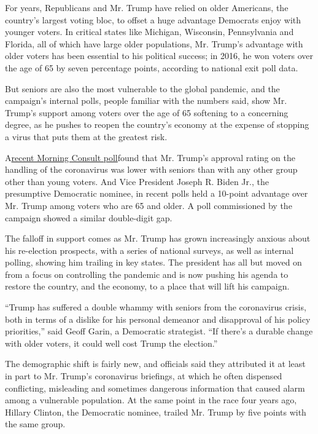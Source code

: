 For years, Republicans and Mr. Trump have relied on older Americans, the
country's largest voting bloc, to offset a huge advantage Democrats
enjoy with younger voters. In critical states like Michigan, Wisconsin,
Pennsylvania and Florida, all of which have large older populations, Mr.
Trump's advantage with older voters has been essential to his political
success; in 2016, he won voters over the age of 65 by seven percentage
points, according to national exit poll data.

But seniors are also the most vulnerable to the global pandemic, and the
campaign's internal polls, people familiar with the numbers said, show
Mr. Trump's support among voters over the age of 65 softening to a
concerning degree, as he pushes to reopen the country's economy at the
expense of stopping a virus that puts them at the greatest risk.

A\href{https://morningconsult.com/form/coronavirus-outbreak-tracker/}{recent
Morning Consult poll}found that Mr. Trump's approval rating on the
handling of the coronavirus was lower with seniors than with any other
group other than young voters. And Vice President Joseph R. Biden Jr.,
the presumptive Democratic nominee, in recent polls held a 10-point
advantage over Mr. Trump among voters who are 65 and older. A poll
commissioned by the campaign showed a similar double-digit gap.

The falloff in support comes as Mr. Trump has grown increasingly anxious
about his re-election prospects, with a series of national surveys, as
well as internal polling, showing him trailing in key states. The
president has all but moved on from a focus on controlling the pandemic
and is now pushing his agenda to restore the country, and the economy,
to a place that will lift his campaign.

``Trump has suffered a double whammy with seniors from the coronavirus
crisis, both in terms of a dislike for his personal demeanor and
disapproval of his policy priorities,'' said Geoff Garin, a Democratic
strategist. ``If there's a durable change with older voters, it could
well cost Trump the election.''

The demographic shift is fairly new, and officials said they attributed
it at least in part to Mr. Trump's coronavirus briefings, at which he
often dispensed conflicting, misleading and sometimes dangerous
information that caused alarm among a vulnerable population. At the same
point in the race four years ago, Hillary Clinton, the Democratic
nominee, trailed Mr. Trump by five points with the same group.

